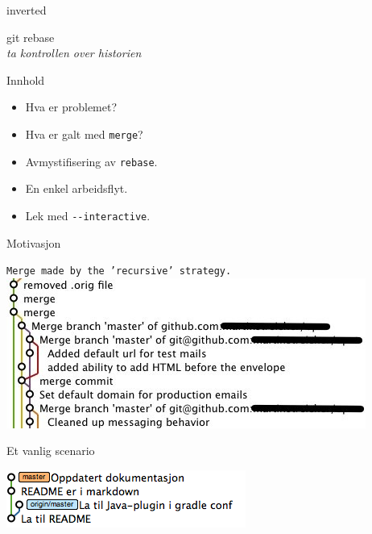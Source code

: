 \documentclass{beamer}
\begin{document}
\begin{frame}
    \begin{beamercolorbox}[ignorebg]{inverted}
    \begin{center}
        \Huge{git rebase}\\
        \vspace{1cm}
        \large{\emph{ta kontrollen over historien}}
    \end{center}
    \end{beamercolorbox}%
\end{frame}

\begin{frame}{Innhold}
    \begin{itemize}
        \item Hva er problemet?
        \item Hva er galt med \lstinline$merge$?
        \item Avmystifisering av \lstinline$rebase$.
        \item En enkel arbeidsflyt.
        \item Lek med \lstinline$--interactive$.
    \end{itemize}
\end{frame}

\begin{frame}{Motivasjon}
    \begin{center}
        \texttt{Merge made by the 'recursive' strategy.}\\
        \medskip
        \pause
        \includegraphics[scale=0.7]{merge_commits.jpg}
    \end{center}
\end{frame}

\begin{frame}{Et vanlig scenario}
    \begin{center}
        \includegraphics[scale=0.7]{1.png}
    \end{center}
\end{frame}
\end{document}
